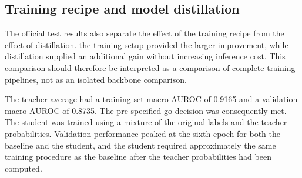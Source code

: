\documentclass[conference]{IEEEtran}
\begin{document}
\subsection{Training recipe and model distillation}
\label{sec:recipe-results}

The official test results also separate the effect of the training recipe from
the effect of distillation. the training setup
provided the larger improvement, while distillation supplied an additional
gain without increasing inference cost. This comparison should therefore be
interpreted as a comparison of complete training pipelines, not as an isolated
backbone comparison.

The teacher average had a training-set macro AUROC of 0.9165 and a validation
macro AUROC of 0.8735. The pre-specified go decision was consequently met. The
student was trained using a mixture of the original labels and the teacher
probabilities. Validation performance peaked at the sixth epoch for both the
baseline and the student, and the student required approximately the same
training procedure as the baseline after the teacher probabilities had been
computed.


\begin{table}[htbp]
\caption{Main systems: accuracy and cost on the official test set. Distilled CNN matches ensemble accuracy at lower cost.}
\label{tab:cost-summary}
\centering
\small
{}
\end{table}



\FloatBarrier

\end{document}
